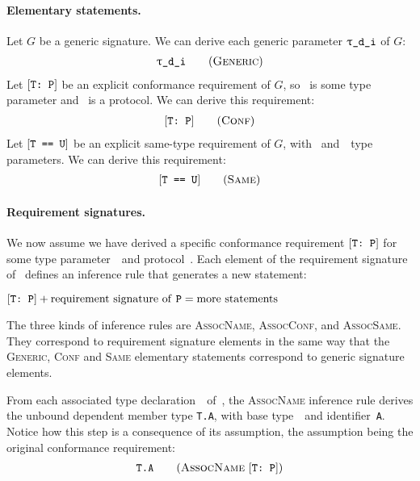 \documentclass[../generics]{subfiles}
\begin{document}
\paragraph{Elementary statements.}
Let $G$ be a generic signature. We can derive each generic parameter $\ttgp{d}{i}$ of $G$:
\begin{gather*}
\GenericStepDef
\end{gather*}
Let $[\texttt{T:~P}]$ be an explicit conformance requirement of $G$, so \tT\ is some type parameter and \tP\ is a protocol. We can derive this requirement:
\begin{gather*}
\ConfStepDef
\end{gather*}
Let $[\texttt{T == U}]$ be an explicit same-type requirement of $G$, with \tT~and~\tU\ type parameters. We can derive this requirement:
\begin{gather*}
\SameStepDef
\end{gather*}

\paragraph{Requirement signatures.}
We now assume we have derived a specific conformance requirement $[\texttt{T:~P}]$ for some type parameter~\tT\ and protocol~\tP. Each element of the requirement signature of \tP\ defines an inference rule that generates a new statement:
\begin{center}
$[\texttt{T:~P}] + \text{requirement signature of \texttt{P}} = \text{more statements}$
\end{center}
The three kinds of inference rules are \textsc{AssocName}, \textsc{AssocConf}, and \textsc{AssocSame}. They correspond to requirement signature elements in the same way that the \textsc{Generic}, \textsc{Conf} and \textsc{Same} elementary statements correspond to generic signature elements.

From each associated type declaration~\nA\ of~\tP, the \textsc{AssocName} inference rule derives the unbound dependent member type \texttt{T.A}, with base type~\tT\ and identifier~\texttt{A}. Notice how this step is a consequence of its assumption, the assumption being the original conformance requirement:
\begin{gather*}
\AssocNameStepDef
\end{gather*}
\end{document}
